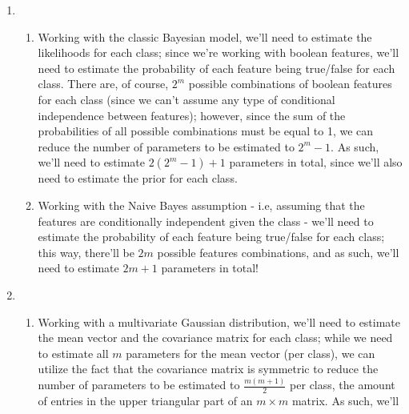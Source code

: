 \documentclass[12pt]{article}
\begin{document}
\begin{enumerate}[leftmargin=\labelsep]
        \begin{enumerate}
          \item {
                \begin{enumerate}
                  \item {
                        Working with the classic Bayesian model, we'll need to estimate
                        the likelihoods for each class; since we're working with boolean
                        features, we'll need to estimate the probability of each feature
                        being true/false for each class. There are, of course, $2^m$ possible
                        combinations of boolean features for each class (since we can't assume
                        any type of conditional independence between features); however, since
                        the sum of the probabilities of all possible combinations must
                        be equal to 1, we can reduce the number of parameters to be estimated
                        to $2^m - 1$. As such, we'll need to estimate $2(2^m - 1) + 1$ parameters
                        in total, since we'll also need to estimate the prior for each class.
                        }
                  \item {
                        Working with the Naive Bayes assumption - i.e, assuming that the features
                        are conditionally independent given the class - we'll need to estimate
                        the probability of each feature being true/false for each class;
                        this way, there'll be $2m$ possible features combinations, and as such,
                        we'll need to estimate $2m + 1$ parameters in total!
                        }
                \end{enumerate}
                }
          \item {
                \begin{enumerate}
                  \item {
                        Working with a multivariate Gaussian distribution, we'll need to estimate
                        the mean vector and the covariance matrix for each class; while we need
                        to estimate all $m$ parameters for the mean vector (per class), we can utilize the
                        fact that the covariance matrix is symmetric to reduce the number of
                        parameters to be estimated to $\frac{m(m+1)}{2}$ per class, the amount of entries
                        in the upper triangular part of an $m \times m$ matrix. As such, we'll
}
\end{enumerate}}
\end{enumerate}
\end{enumerate}
\end{document}
